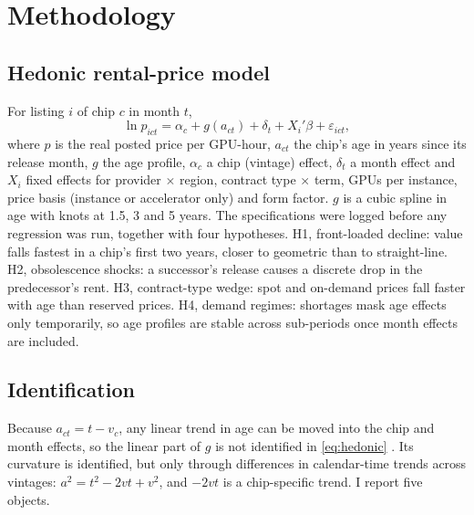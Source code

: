 \section{Methodology}
\label{sec:method}

\subsection{Hedonic rental-price model}

For listing $i$ of chip $c$ in month $t$,
\begin{equation}
\ln p_{ict} = \alpha_c + g(a_{ct}) + \delta_t + X_i'\beta + \varepsilon_{ict},
\label{eq:hedonic}
\end{equation}
where $p$ is the real posted price per GPU-hour, $a_{ct}$ the chip's age in years since its release
month, $g$ the age profile, $\alpha_c$ a chip (vintage) effect, $\delta_t$ a month effect and $X_i$
fixed effects for provider $\times$ region, contract type $\times$ term, GPUs per instance, price
basis (instance or accelerator only) and form factor. $g$ is a cubic spline in age with knots at
1.5, 3 and 5 years. The specifications were logged before any regression was run, together with
four hypotheses. H1, front-loaded decline: value falls fastest in a chip's first two years, closer
to geometric than to straight-line. H2, obsolescence shocks: a successor's release causes a
discrete drop in the predecessor's rent. H3, contract-type wedge: spot and on-demand prices fall
faster with age than reserved prices. H4, demand regimes: shortages mask age effects only
temporarily, so age profiles are stable across sub-periods once month effects are included.

\subsection{Identification}

Because $a_{ct} = t - v_c$, any linear trend in age can be moved into the chip and month effects,
so the linear part of $g$ is not identified in \eqref{eq:hedonic} \citep{hall1968technical}. Its
curvature is identified, but only through differences in calendar-time trends across vintages:
$a^2 = t^2 - 2 v t + v^2$, and $-2vt$ is a chip-specific trend. I report five objects.

